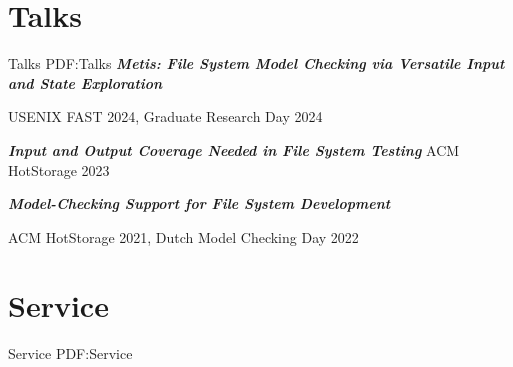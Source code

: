 \documentclass[a4paper,10pt,oneside]{article}
\begin{document}
\begin{body}









\section
{Talks}
{Talks}
{PDF:Talks}
\BulletItem
\textbf{\textit{Metis: File System Model Checking via Versatile Input and State Exploration}}

\SubBulletItem
USENIX FAST 2024, Graduate Research Day 2024 %


\GapNoBreak

\BulletItem
\textbf{\textit{Input and Output Coverage Needed in File System Testing}}
\SubBulletItem
ACM HotStorage 2023 %

\GapNoBreak

\BulletItem
\textbf{\textit{Model-Checking Support for File System Development}}

\SubBulletItem
ACM HotStorage 2021, Dutch Model Checking Day 2022




\section
{Service}
{Service}
{PDF:Service}



\end{body}
\end{document}
